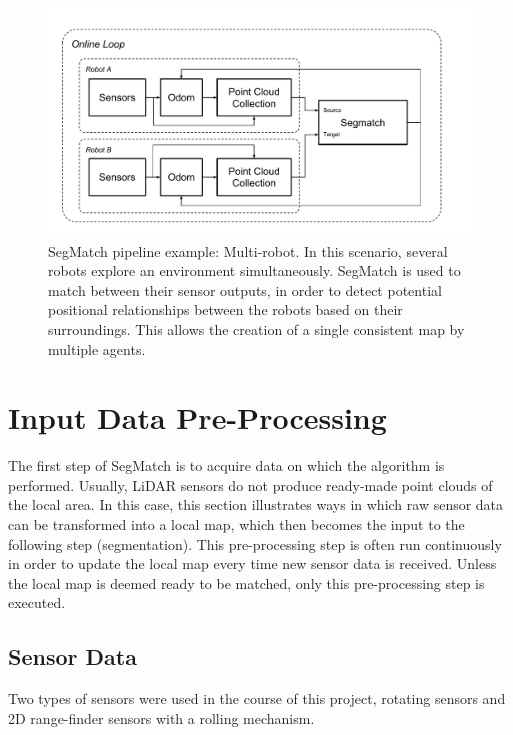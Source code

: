 \begin{figure}
  \centering
  \includegraphics[width=5.2in]{images/Multi-robot_Pipeline.pdf}
  \caption{SegMatch pipeline example: Multi-robot. In this scenario, several robots explore an environment simultaneously. SegMatch is used to match between their sensor outputs, in order to detect potential positional relationships between the robots based on their surroundings. This allows the creation of a single consistent map by multiple agents.}
  \label{fig:multirobot_pipeline}
\end{figure}


\section{Input Data Pre-Processing}
\label{sec:input}

The first step of SegMatch is to acquire data on which the algorithm is performed. Usually, LiDAR sensors do not produce ready-made point clouds of the local area. In this case, this section illustrates ways in which raw sensor data can be transformed into a local map, which then becomes the input to the following step (segmentation). This pre-processing step is often run continuously in order to update the local map every time new sensor data is received. Unless the local map is deemed ready to be matched, only this pre-processing step is executed.\\


\subsection{Sensor Data}
\label{subsec:sensordata}

Two types of sensors were used in the course of this project, rotating sensors and 2D range-finder sensors with a rolling mechanism. \\

